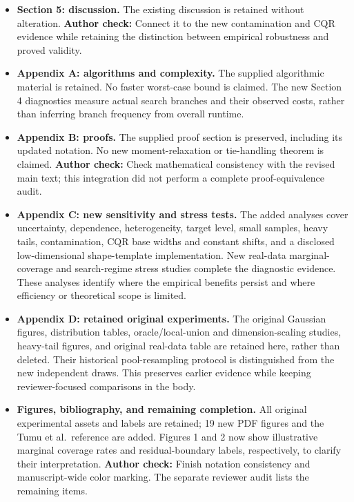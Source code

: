 \documentclass[10pt]{article}
\newcommand{\checkauthor}[1]{\textcolor{red!65!black}{\textbf{Author check:} #1}}
\begin{document}
\begin{itemize}
\item \textbf{Section 5: discussion.}
The existing discussion is retained without alteration.
\checkauthor{Connect it to the new contamination and CQR evidence while
retaining the distinction between empirical robustness and proved validity.}

\item \textbf{Appendix A: algorithms and complexity.}
The supplied algorithmic material is retained. No faster worst-case bound is
claimed. The new Section 4 diagnostics measure actual search branches and
their observed costs, rather than inferring branch frequency from overall runtime.

\item \textbf{Appendix B: proofs.}
The supplied proof section is preserved, including its updated notation.
No new moment-relaxation or tie-handling theorem is claimed.
\checkauthor{Check mathematical consistency with the revised main text; this
integration did not perform a complete proof-equivalence audit.}

\item \textbf{Appendix C: new sensitivity and stress tests.}
The added analyses cover uncertainty, dependence, heterogeneity, target level,
small samples, heavy tails, contamination, CQR base widths and constant shifts,
and a disclosed low-dimensional shape-template implementation. New real-data
marginal-coverage and search-regime stress studies complete the diagnostic
evidence. These analyses identify
where the empirical benefits persist and where efficiency or theoretical
scope is limited.

\item \textbf{Appendix D: retained original experiments.}
The original Gaussian figures, distribution tables, oracle/local-union and
dimension-scaling studies, heavy-tail figures, and original real-data table
are retained here, rather than deleted. Their historical pool-resampling
protocol is distinguished from the new independent draws. This preserves
earlier evidence while keeping reviewer-focused comparisons in the body.

\item \textbf{Figures, bibliography, and remaining completion.}
All original experimental assets and labels are retained; 19 new PDF figures
and the Tumu et al.\ reference are added. Figures 1 and 2 now show illustrative
marginal coverage rates and residual-boundary labels, respectively, to clarify
their interpretation. \checkauthor{Finish notation consistency and
manuscript-wide color marking.} The separate reviewer audit lists the remaining items.
\end{itemize}
\end{document}
